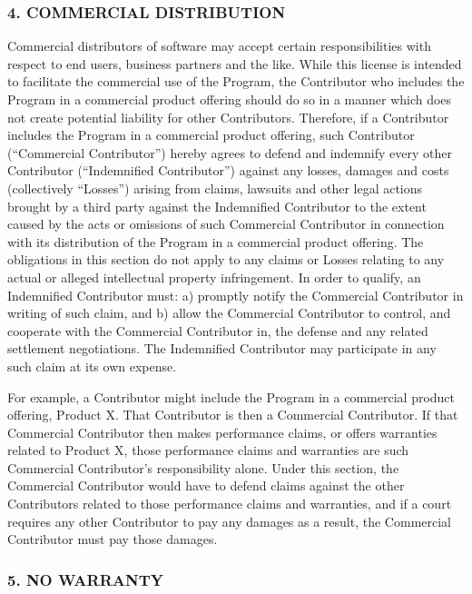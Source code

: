 \subsubsection*{4.  COMMERCIAL DISTRIBUTION}

Commercial distributors of software may accept
certain responsibilities with respect to end users, business partners
and the like. While this license is intended to facilitate the
commercial use of the Program, the Contributor who includes the Program
in a commercial product offering should do so in a manner which does
not create potential liability for other Contributors. Therefore, if a
Contributor includes the Program in a commercial product offering, such
Contributor (``Commercial Contributor'') hereby agrees to defend and
indemnify every other Contributor (``Indemnified Contributor'') against
any losses, damages and costs (collectively ``Losses'') arising from
claims, lawsuits and other legal actions brought by a third party
against the Indemnified Contributor to the extent caused by the acts or
omissions of such Commercial Contributor in connection with its
distribution of the Program in a commercial product offering. The
obligations in this section do not apply to any claims or Losses
relating to any actual or alleged intellectual property infringement.
In order to qualify, an Indemnified Contributor must: a) promptly
notify the Commercial Contributor in writing of such claim, and b)
allow the Commercial Contributor to control, and cooperate with the
Commercial Contributor in, the defense and any related settlement
negotiations. The Indemnified Contributor may participate in any such
claim at its own expense.

For example, a Contributor might include the
Program in a commercial product offering, Product X. That Contributor
is then a Commercial Contributor. If that Commercial Contributor then
makes performance claims, or offers warranties related to Product X,
those performance claims and warranties are such Commercial
Contributor's responsibility alone. Under this section, the Commercial
Contributor would have to defend claims against the other Contributors
related to those performance claims and warranties, and if a court
requires any other Contributor to pay any damages as a result, the
Commercial Contributor must pay those damages.


\subsubsection*{5.  NO WARRANTY}


